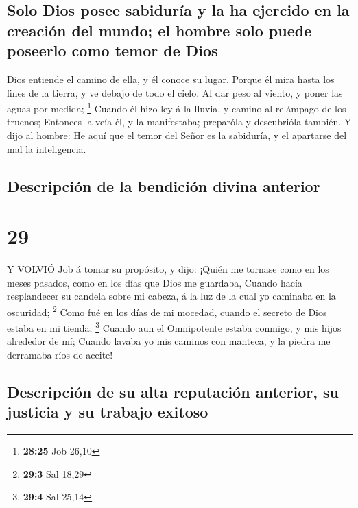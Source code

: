 \hypertarget{solo-dios-posee-sabiduruxeda-y-la-ha-ejercido-en-la-creaciuxf3n-del-mundo-el-hombre-solo-puede-poseerlo-como-temor-de-dios}{%
\subsection{Solo Dios posee sabiduría y la ha ejercido en la creación
del mundo; el hombre solo puede poseerlo como temor de
Dios}\label{solo-dios-posee-sabiduruxeda-y-la-ha-ejercido-en-la-creaciuxf3n-del-mundo-el-hombre-solo-puede-poseerlo-como-temor-de-dios}}

 Dios entiende el camino de ella, y él conoce su lugar.
 Porque él mira hasta los fines de la tierra, y ve debajo
de todo el cielo.  Al dar peso al viento, y poner las aguas
por medida; \footnote{\textbf{28:25} Job 26,10}  Cuando él
hizo ley á la lluvia, y camino al relámpago de los truenos;
 Entonces la veía él, y la manifestaba; preparóla y
descubrióla también.  Y dijo al hombre: He aquí que el
temor del Señor es la sabiduría, y el apartarse del mal la inteligencia.

\hypertarget{descripciuxf3n-de-la-bendiciuxf3n-divina-anterior}{%
\subsection{Descripción de la bendición divina
anterior}\label{descripciuxf3n-de-la-bendiciuxf3n-divina-anterior}}

\hypertarget{section-28}{%
\section{29}\label{section-28}}

 Y VOLVIÓ Job á tomar su propósito, y dijo: 
¡Quién me tornase como en los meses pasados, como en los días que Dios
me guardaba,  Cuando hacía resplandecer su candela sobre mi
cabeza, á la luz de la cual yo caminaba en la oscuridad; \footnote{\textbf{29:3}
  Sal 18,29}  Como fué en los días de mi mocedad, cuando el
secreto de Dios estaba en mi tienda; \footnote{\textbf{29:4} Sal 25,14}
 Cuando aun el Omnipotente estaba conmigo, y mis hijos
alrededor de mí;  Cuando lavaba yo mis caminos con manteca,
y la piedra me derramaba ríos de aceite!

\hypertarget{descripciuxf3n-de-su-alta-reputaciuxf3n-anterior-su-justicia-y-su-trabajo-exitoso}{%
\subsection{Descripción de su alta reputación anterior, su justicia y su
trabajo
exitoso}\label{descripciuxf3n-de-su-alta-reputaciuxf3n-anterior-su-justicia-y-su-trabajo-exitoso}}

